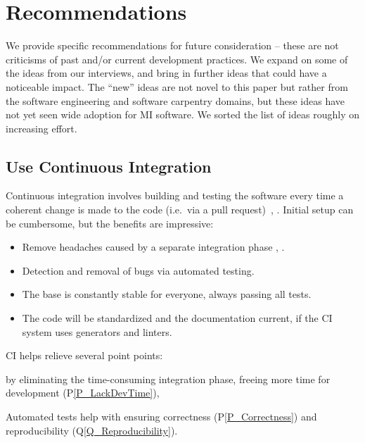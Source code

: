 \documentclass[doubleblind,12pt, 3p, times]{elsarticle}
\newcommand{\ppref}[1]{P\ref{#1}}
\newcommand{\qref}[1]{Q\ref{#1}}
\begin{document}
\section{Recommendations} \label{ch_recommendations}

We provide specific recommendations for future consideration -- these are not
criticisms of past and/or current development practices. We expand on some of
the ideas from our interviews, and bring in further ideas that could have a
noticeable impact. The ``new'' ideas are not novel to this paper but rather from
the software engineering and software carpentry domains, but these ideas have
not yet seen wide adoption for MI software.  We sorted the list of ideas roughly
on increasing effort.

\subsection{Use Continuous Integration} \label{Sec_ContinuousIntegration}

Continuous integration involves building and testing the software every time a
coherent change is made to the code (i.e.\ via a pull request)~\cite[p.\ 13]
{HumbleAndFarley2010}, \cite{ShahinEtAl2017, Fowler2006}. Initial setup can be
cumbersome, but the benefits are impressive:

\begin{itemize}
    \item Remove headaches caused by a separate integration phase
    \cite{Fowler2006}, \cite[p.\ 20]{HumbleAndFarley2010}.
    \item Detection and removal of bugs \cite{Fowler2006} via
    automated testing.  
    \item The base is constantly stable for everyone, always passing all tests.
    \item The code will be standardized and the documentation current, if the CI
    system uses generators and linters.
\end{itemize}

CI helps relieve several point points:
\begin{enumerate*}
\item by eliminating the time-consuming integration phase, 
freeing more time for development (\ppref{P_LackDevTime}),
\item Automated tests help with ensuring
correctness (\ppref{P_Correctness}) and reproducibility
(\qref{Q_Reproducibility}). 
\end{enumerate*}
\end{document}

